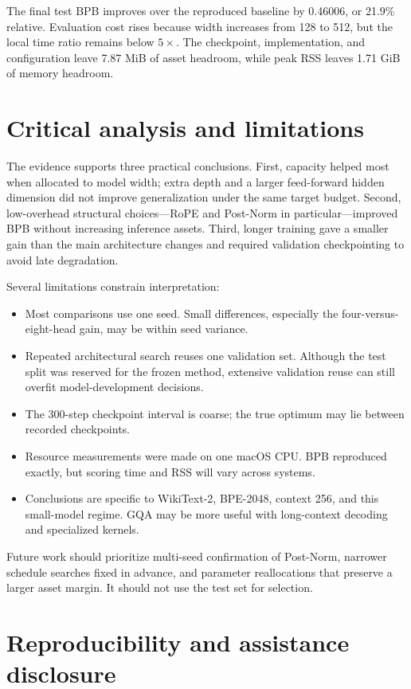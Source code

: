\documentclass[10pt]{article}
\begin{document}
The final test BPB improves over the reproduced baseline by 0.46006, or 21.9\% relative. Evaluation cost rises because width increases from 128 to 512, but the local time ratio remains below $5\times$. The checkpoint, implementation, and configuration leave 7.87 MiB of asset headroom, while peak RSS leaves 1.71 GiB of memory headroom.

\section{Critical analysis and limitations}

The evidence supports three practical conclusions. First, capacity helped most when allocated to model width; extra depth and a larger feed-forward hidden dimension did not improve generalization under the same target budget. Second, low-overhead structural choices---RoPE and Post-Norm in particular---improved BPB without increasing inference assets. Third, longer training gave a smaller gain than the main architecture changes and required validation checkpointing to avoid late degradation.

Several limitations constrain interpretation:
\begin{itemize}
\item Most comparisons use one seed. Small differences, especially the four-versus-eight-head gain, may be within seed variance.
\item Repeated architectural search reuses one validation set. Although the test split was reserved for the frozen method, extensive validation reuse can still overfit model-development decisions.
\item The 300-step checkpoint interval is coarse; the true optimum may lie between recorded checkpoints.
\item Resource measurements were made on one macOS CPU. BPB reproduced exactly, but scoring time and RSS will vary across systems.
\item Conclusions are specific to WikiText-2, BPE-2048, context 256, and this small-model regime. GQA may be more useful with long-context decoding and specialized kernels.
\end{itemize}

Future work should prioritize multi-seed confirmation of Post-Norm, narrower schedule searches fixed in advance, and parameter reallocations that preserve a larger asset margin. It should not use the test set for selection.

\section{Reproducibility and assistance disclosure}
\end{document}
